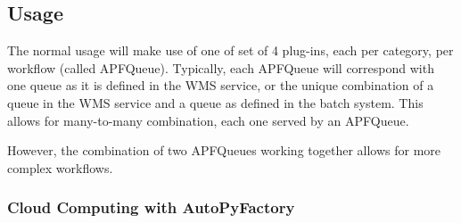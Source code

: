 \documentclass[a4paper]{jpconf}
\begin{document}








\subsection{Usage}

The normal usage will make use of one of set of 4 plug-ins, each per category, per workflow (called APFQueue). 
Typically, each APFQueue will correspond with one queue as it is defined in the WMS service, 
or the unique combination of a queue in the WMS service and a queue as defined in the batch system. 
This allows for many-to-many combination, each one served by an APFQueue. 

However, the combination of two APFQueues working together allows for more complex workflows.

\subsubsection{Cloud Computing with AutoPyFactory }

~
\end{document}
